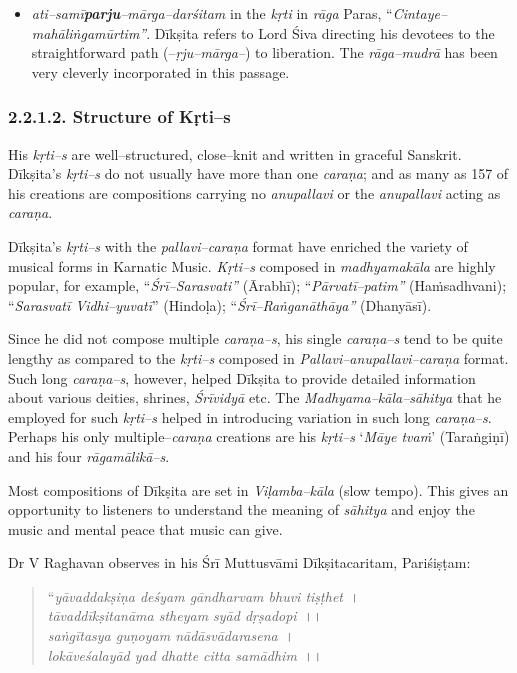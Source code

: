 \begin{itemize}
 \item \textit{ati–samī\textbf{parju}–mārga–darśitam} in the \textit{kṛti} in \textit{rāga} Paras, “\textit{Cintaye–mahāliṅgamūrtim”}. Dīkṣita refers to Lord Śiva directing his devotees to the straightforward path (–\textit{ṛju–mārga–}) to liberation. The \textit{rāga–mudrā} has been very cleverly incorporated in this passage.

\end{itemize}


\subsubsection*{2.2.1.2. Structure of Kṛti–s}

His \textit{kṛti–s} are well–structured, close–knit and written in graceful Sanskrit. Dīkṣita’s \textit{kṛti–s} do not usually have more than one \textit{caraṇa}; and as many as 157 of his creations are compositions carrying no \textit{anupallavi} or the \textit{anupallavi} acting as \textit{caraṇa}.

Dīkṣita’s \textit{kṛti–s} with the \textit{pallavi–caraṇa} format have enriched the variety of musical forms in Karnatic Music. \textit{Kṛti–s} composed in \textit{madhyamakāla} are highly popular, for example, “\textit{Śrī–Sarasvati”} (Ārabhī); “\textit{Pārvatī–patim”} (Haṁsadhvani); “\textit{Sarasvatī Vidhi–yuvatī}” (Hindoḷa); “\textit{Śrī–Raṅganāthāya”} (Dhanyāsī).

Since he did not compose multiple \textit{caraṇa–s}, his single \textit{caraṇa–s} tend to be quite lengthy as compared to the \textit{kṛti–s} composed in \textit{Pallavi–anupallavi–caraṇa} format. Such long \textit{caraṇa–s}, however, helped Dīkṣita to provide detailed information about various deities, shrines, \textit{Śrīvidyā} etc. The \textit{Madhyama–kāla–sāhitya} that he employed for such \textit{kṛti–s} helped in introducing variation in such long \textit{caraṇa–s}. Perhaps his only multiple–\textit{caraṇa} creations are his \textit{kṛti–s} ‘\textit{Māye tvaṁ}’ (Taraṅgiṇī) and his four \textit{rāgamālikā–s}.

Most compositions of Dīkṣita are set in \textit{Viḷamba–kāla} (slow tempo). This gives an opportunity to listeners to understand the meaning of \textit{sāhitya} and enjoy the music and mental peace that music can give.

Dr V Raghavan observes in his Śrī Muttusvāmi Dīkṣitacaritam, Pariśiṣṭam:

\begin{verse}
“\textit{yāvaddakṣiṇa deśyam gāndharvam bhuvi tiṣṭhet}~।\\\textit{tāvaddīkṣitanāma stheyam syād dṛṣadopi}~।।\\\textit{saṅgītasya guṇoyam nādāsvādarasena}~।\\\textit{lokāveśalayād yad dhatte citta samādhim}~।।
\end{verse}

